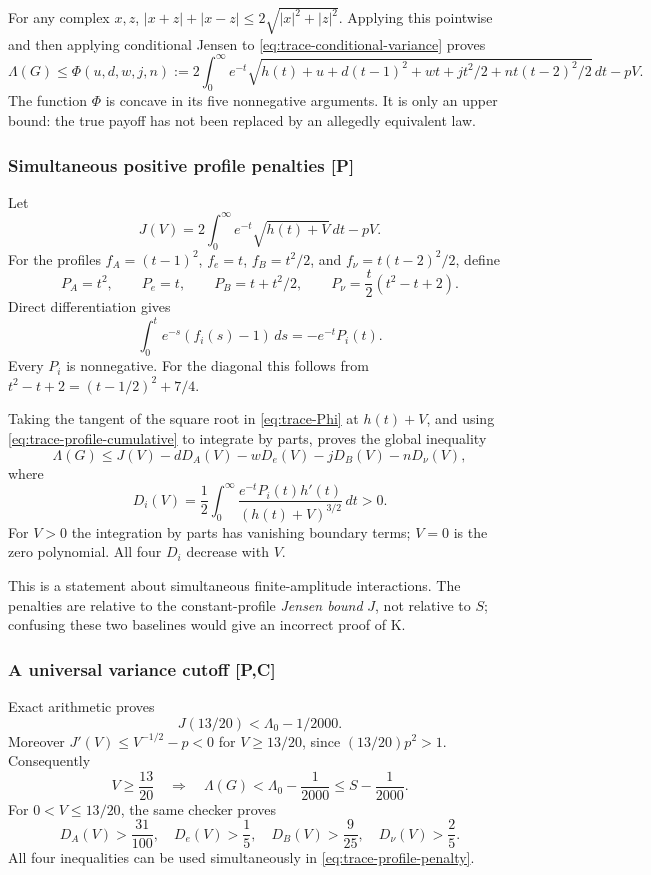 For any complex $x,z$,
$|x+z|+|x-z|\le2\sqrt{|x|^2+|z|^2}$.
Applying this pointwise and then applying conditional Jensen to
\eqref{eq:trace-conditional-variance} proves
\begin{equation}
\Lambda(G)\le\Phi(u,d,w,j,n)
:=2\int_0^\infty e^{-t}
\sqrt{h(t)+u+d(t-1)^2+wt+jt^2/2+nt(t-2)^2/2}\,dt-pV.
\label{eq:trace-Phi}
\end{equation}
The function $\Phi$ is concave in its five nonnegative arguments.
It is only an upper bound: the true payoff has not been replaced by an
allegedly equivalent law.

\subsubsection{Simultaneous positive profile penalties [P]}
Let
\[
J(V)=2\int_0^\infty e^{-t}\sqrt{h(t)+V}\,dt-pV.
\]
For the profiles $f_A=(t-1)^2$, $f_e=t$, $f_B=t^2/2$,
and $f_\nu=t(t-2)^2/2$, define
\[
P_A=t^2,\qquad P_e=t,\qquad P_B=t+t^2/2,\qquad
P_\nu=\frac t2(t^2-t+2).
\]
Direct differentiation gives
\begin{equation}
\int_0^t e^{-s}(f_i(s)-1)\,ds=-e^{-t}P_i(t).
\label{eq:trace-profile-cumulative}
\end{equation}
Every $P_i$ is nonnegative. For the diagonal this follows from
$t^2-t+2=(t-1/2)^2+7/4$.

Taking the tangent of the square root in \eqref{eq:trace-Phi} at
$h(t)+V$, and using \eqref{eq:trace-profile-cumulative} to integrate by
parts, proves the global inequality
\begin{equation}
\boxed{\Lambda(G)\le J(V)-dD_A(V)-wD_e(V)-jD_B(V)-nD_\nu(V),}
\label{eq:trace-profile-penalty}
\end{equation}
where
\[
D_i(V)=\frac12\int_0^\infty
\frac{e^{-t}P_i(t)h'(t)}{(h(t)+V)^{3/2}}\,dt>0.
\]
For $V>0$ the integration by parts has vanishing boundary terms; $V=0$
is the zero polynomial. All four $D_i$ decrease with $V$.

This is a statement about simultaneous finite-amplitude interactions.
The penalties are relative to the constant-profile \emph{Jensen bound}
$J$, not relative to $S$; confusing these two baselines would give an
incorrect proof of K.

\subsubsection{A universal variance cutoff [P,C]}
Exact arithmetic proves
\[
J(13/20)<\Lambda_0-1/2000.
\]
Moreover $J'(V)\le V^{-1/2}-p<0$ for $V\ge13/20$, since
$(13/20)p^2>1$. Consequently
\begin{equation}
\boxed{V\ge\frac{13}{20}\quad\Longrightarrow\quad
\Lambda(G)<\Lambda_0-\frac1{2000}\le S-\frac1{2000}.}
\label{eq:trace-variance-cutoff}
\end{equation}
For $0<V\le13/20$, the same checker proves
\begin{equation}
D_A(V)>\frac{31}{100},\quad D_e(V)>\frac15,\quad
D_B(V)>\frac9{25},\quad D_\nu(V)>\frac25.
\label{eq:trace-explicit-penalties}
\end{equation}
All four inequalities can be used simultaneously in
\eqref{eq:trace-profile-penalty}.

